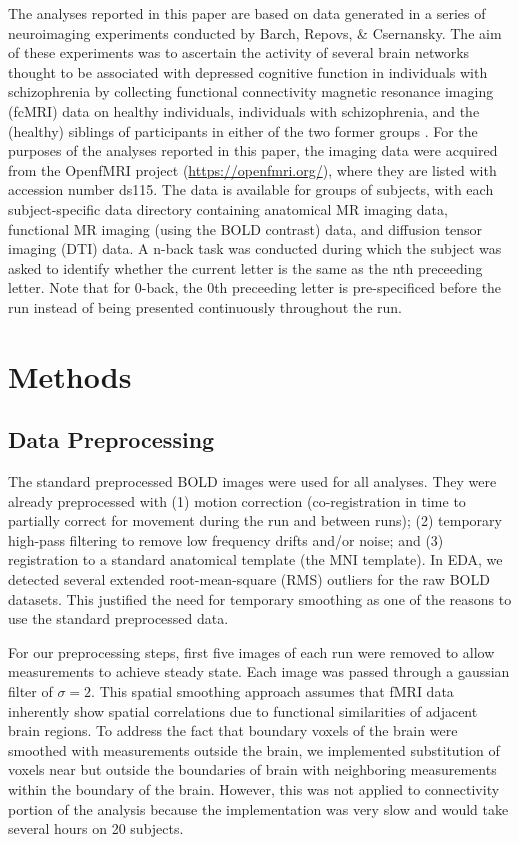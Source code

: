 \documentclass[11pt]{article}
\begin{document}
The analyses reported in this paper are based on data generated in a series of
neuroimaging experiments conducted by Barch, Repovs, \& Csernansky. The aim of
these experiments was to ascertain the activity of several brain networks
thought to be associated with depressed cognitive function in individuals with
schizophrenia by collecting functional connectivity magnetic resonance imaging
(fcMRI) data on healthy individuals, individuals with schizophrenia, and the
(healthy) siblings of participants in either of the two former groups
\cite{repovs2012}. For the purposes of the analyses reported in this paper, the imaging
data were acquired from the OpenfMRI project (\url{https://openfmri.org/}), where they
are listed with accession number ds115. The data is available for groups of
subjects, with each subject-specific data directory containing anatomical MR
imaging data, functional MR imaging (using the BOLD contrast) data, and
diffusion tensor imaging (DTI) data. A n-back task was conducted during which the
subject was asked to identify whether the current letter is the same as the 
nth preceeding letter. Note that for 0-back, the 0th preceeding letter is 
pre-specificed before the run instead of being presented continuously throughout the run. 


\section{Methods}

\subsection{Data Preprocessing}

The standard preprocessed BOLD images were used for all analyses. They were already preprocessed with (1) motion correction (co-registration in time to partially correct for movement during the run and between runs); (2) temporary high-pass filtering to remove low frequency drifts and/or noise; and (3) registration to a standard anatomical template (the MNI template). In EDA, we detected several extended root-mean-square (RMS) outliers for the raw BOLD datasets. This justified the need for temporary smoothing as one of the reasons to use the standard preprocessed data. 

For our preprocessing steps, first five images of each run were removed to allow measurements to achieve steady state. Each image was passed through a gaussian filter of $\sigma=2$. This spatial smoothing approach assumes that fMRI data inherently show spatial correlations due to functional similarities of adjacent brain regions. To address the fact that boundary voxels of the brain were smoothed with measurements outside the brain, we implemented substitution of voxels near but outside the boundaries of brain with neighboring measurements within the boundary of the brain. However, this was not applied to connectivity portion of the analysis because the implementation was very slow and would take several hours on 20 subjects.
\end{document}
